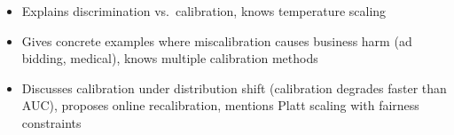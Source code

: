 \begin{interviewq}

\goodgreat
\begin{itemize}
    \item {} Explains discrimination vs.\ calibration, knows temperature scaling
    \item {} Gives concrete examples where miscalibration causes business harm (ad bidding, medical), knows multiple calibration methods
    \item {} Discusses calibration under distribution shift (calibration degrades faster than AUC), proposes online recalibration, mentions Platt scaling with fairness constraints
\end{itemize}

\end{interviewq}

